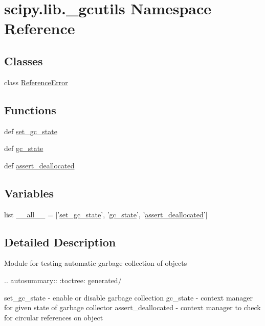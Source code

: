 \hypertarget{namespacescipy_1_1lib_1_1__gcutils}{}\section{scipy.\+lib.\+\_\+gcutils Namespace Reference}
\label{namespacescipy_1_1lib_1_1__gcutils}
\subsection*{Classes}
\begin{DoxyCompactItemize}
\item 
class \hyperlink{classscipy_1_1lib_1_1__gcutils_1_1ReferenceError}{Reference\+Error}
\end{DoxyCompactItemize}
\subsection*{Functions}
\begin{DoxyCompactItemize}
\item 
def \hyperlink{namespacescipy_1_1lib_1_1__gcutils_af43ea7b777c2babeb588837327479a05}{set\+\_\+gc\+\_\+state}
\item 
def \hyperlink{namespacescipy_1_1lib_1_1__gcutils_a90cd927586a3514714abf103061ffce1}{gc\+\_\+state}
\item 
def \hyperlink{namespacescipy_1_1lib_1_1__gcutils_a37813c4cab39f7cf6e4a68e32d954d2a}{assert\+\_\+deallocated}
\end{DoxyCompactItemize}
\subsection*{Variables}
\begin{DoxyCompactItemize}
\item 
list \hyperlink{namespacescipy_1_1lib_1_1__gcutils_afdae5d527a339580a2f00cc483e09aa7}{\+\_\+\+\_\+all\+\_\+\+\_\+} = \mbox{[}'\hyperlink{namespacescipy_1_1lib_1_1__gcutils_af43ea7b777c2babeb588837327479a05}{set\+\_\+gc\+\_\+state}', '\hyperlink{namespacescipy_1_1lib_1_1__gcutils_a90cd927586a3514714abf103061ffce1}{gc\+\_\+state}', '\hyperlink{namespacescipy_1_1lib_1_1__gcutils_a37813c4cab39f7cf6e4a68e32d954d2a}{assert\+\_\+deallocated}'\mbox{]}
\end{DoxyCompactItemize}


\subsection{Detailed Description}
\begin{DoxyVerb}Module for testing automatic garbage collection of objects

.. autosummary::
   :toctree: generated/

   set_gc_state - enable or disable garbage collection
   gc_state - context manager for given state of garbage collector
   assert_deallocated - context manager to check for circular references on object\end{DoxyVerb}
 

